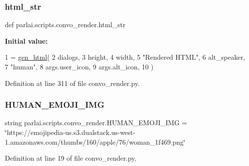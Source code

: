 \subsubsection{\texorpdfstring{html\+\_\+str}{html\_str}}
{\footnotesize\ttfamily def parlai.\+scripts.\+convo\+\_\+render.\+html\+\_\+str}

{\bfseries Initial value\+:}
\begin{DoxyCode}
1 =  \hyperlink{namespaceparlai_1_1scripts_1_1convo__render_ad23695f4d64e7dbd1fee801098d570b2}{gen\_html}(
2             dialogs,
3             height,
4             width,
5             \textcolor{stringliteral}{"Rendered HTML"},
6             alt\_speaker,
7             \textcolor{stringliteral}{"human"},
8             args.user\_icon,
9             args.alt\_icon,
10         )
\end{DoxyCode}


Definition at line 311 of file convo\+\_\+render.\+py.

\mbox{\label{namespaceparlai_1_1scripts_1_1convo__render_a8c9924b497f4ab5ba5f2c7afdd3f1007}} 
\subsubsection{\texorpdfstring{H\+U\+M\+A\+N\+\_\+\+E\+M\+O\+J\+I\+\_\+\+I\+MG}{HUMAN\_EMOJI\_IMG}}
{\footnotesize\ttfamily string parlai.\+scripts.\+convo\+\_\+render.\+H\+U\+M\+A\+N\+\_\+\+E\+M\+O\+J\+I\+\_\+\+I\+MG = \char`\"{}https\+://emojipedia-\/us.\+s3.\+dualstack.\+us-\/west-\/1.amazonaws.\+com/thumbs/160/apple/76/woman\+\_\+1f469.\+png\char`\"{}}



Definition at line 19 of file convo\+\_\+render.\+py.

\mbox{\label{namespaceparlai_1_1scripts_1_1convo__render_a708724a5430d3e0236e76dc23ed66801}} 

